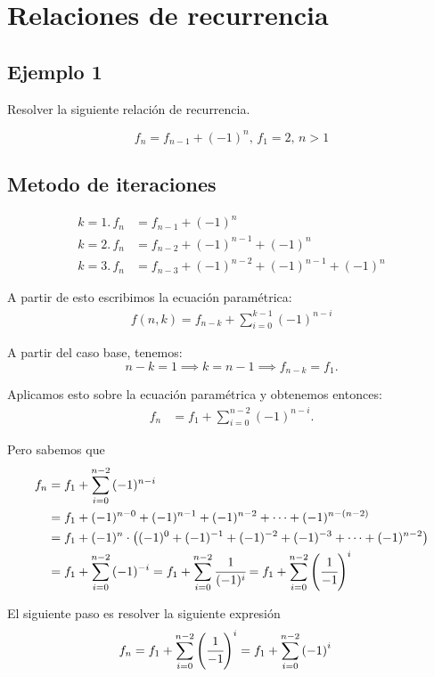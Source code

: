 \section{Relaciones de recurrencia}

\subsection{Ejemplo 1}
Resolver la siguiente relación de recurrencia.

$$f_n=f_{n-1}+(-1)^n,\,f_1=2,\,n>1$$

\subsection{Metodo de iteraciones}
\begin{align*}
k=1.\,f_n&=f_{n-1}+(-1)^n\\
k=2.\,f_n&=f_{n-2}+(-1)^{n-1}+(-1)^n\\
k=3.\,f_n&=f_{n-3}+(-1)^{n-2}+(-1)^{n-1}+(-1)^n
\end{align*}

A partir de esto escribimos la ecuación paramétrica:
\begin{align*}
f(n,k)=f_{n-k}+\sum_{i=0}^{k-1}{(-1)^{n-i}}
\end{align*}

A partir del caso base, tenemos:
$$n-k=1\implies k=n-1\implies f_{n-k}=f_1.$$

Aplicamos esto sobre la ecuación paramétrica y obtenemos entonces:
\begin{align*}
f_n&=f_{1}+\sum_{i=0}^{n-2}{(-1)^{n-i}}.
\end{align*}

Pero sabemos que
\begin{align*}
f_n&=f_{1}+\sum_{i=0}^{n-2}{(-1)^{n-i}}\\
&=f_1+(-1)^{n-0}+(-1)^{n-1}+(-1)^{n-2}+\cdots+{(-1)^{n-(n-2)}}\\
&=f_1+(-1)^n\cdot\left((-1)^0+(-1)^{-1}+(-1)^{-2}+(-1)^{-3}+\cdots+(-1)^{n-2}\right)
\\
&=f_1+\sum_{i=0}^{n-2}{(-1)^{-i}}=f_1+\sum_{i=0}^{n-2}{\cfrac{1}{(-1)^i}}=f_1+\sum_{i=0}^{n-2}{\left(\cfrac{1}{-1}\right)^i}
\end{align*}

El siguiente paso es resolver la siguiente expresión
\begin{align*}
f_n&=f_1+\sum_{i=0}^{n-2}{\left(\cfrac{1}{-1}\right)^i}=f_1+\sum_{i=0}^{n-2}{\left(-1\right)^i}
\end{align*}

